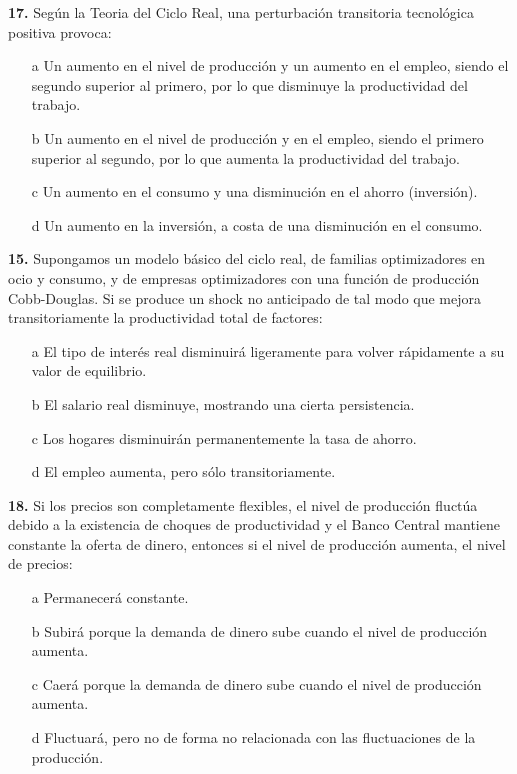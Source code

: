 \documentclass{nuevotema}
\begin{document}

\textbf{17.} Según la Teoria del Ciclo Real, una perturbación transitoria tecnológica positiva provoca:
\begin{itemize}
	\item[a] Un aumento en el nivel de producción y un aumento en el empleo, siendo el segundo superior al primero, por lo que disminuye la productividad del trabajo.
	\item[b] Un aumento en el nivel de producción y en el empleo, siendo el primero superior al segundo, por lo que aumenta la productividad del trabajo.
	\item[c] Un aumento en el consumo y una disminución en el ahorro (inversión).
	\item[d] Un aumento en la inversión, a costa de una disminución en el consumo.
\end{itemize}


\textbf{15.} Supongamos un modelo básico del ciclo real, de familias optimizadores en ocio y consumo, y de empresas optimizadores con una función de producción Cobb-Douglas. Si se produce un shock no anticipado de tal modo que mejora transitoriamente la productividad total de factores:
\begin{itemize}
	\item[a] El tipo de interés real disminuirá ligeramente para volver rápidamente a su valor de equilibrio.
	\item[b] El salario real disminuye, mostrando una cierta persistencia.
	\item[c] Los hogares disminuirán permanentemente la tasa de ahorro.
	\item[d] El empleo aumenta, pero sólo transitoriamente.
\end{itemize}


\textbf{18.} Si los precios son completamente flexibles, el nivel de producción fluctúa debido a la existencia de choques de productividad y el Banco Central mantiene constante la oferta de dinero, entonces si el nivel de producción aumenta, el nivel de precios:

\begin{itemize}
	\item[a] Permanecerá constante.
	\item[b] Subirá porque la demanda de dinero sube cuando el nivel de producción aumenta.
	\item[c] Caerá porque la demanda de dinero sube cuando el nivel de producción aumenta.
	\item[d] Fluctuará, pero no de forma no relacionada con las fluctuaciones de la producción.
\end{itemize}
\end{document}
